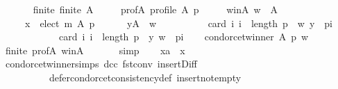 \begin{isabellebody}
\ \ \isamarkupfalse%
\isanewline
\ \ \ \ finite{\isacharcolon}{\kern0pt}\ {\isachardoublequoteopen}finite\ A{\isachardoublequoteclose}\ \isanewline
\ \ \ \ prof{\isacharunderscore}{\kern0pt}A{\isacharcolon}{\kern0pt}\ {\isachardoublequoteopen}profile\ A\ p{\isachardoublequoteclose}\ \isanewline
\ \ \ \ w{\isacharunderscore}{\kern0pt}in{\isacharunderscore}{\kern0pt}A{\isacharcolon}{\kern0pt}\ {\isachardoublequoteopen}w\ {\isasymin}\ A{\isachardoublequoteclose}\ \isanewline
\ \ \ \ {}{\isacharcolon}{\kern0pt}\ {\isachardoublequoteopen}x\ {\isasymin}\ elect\ m\ A\ p{\isachardoublequoteclose}\ \isanewline
\ \ \ \ {}{\isacharcolon}{\kern0pt}\ {\isachardoublequoteopen}{\isasymforall}y{\isasymin}A\ {\isacharminus}{\kern0pt}\ {\isacharbraceleft}{\kern0pt}w{\isacharbraceright}{\kern0pt}{\isachardot}{\kern0pt}\isanewline
\ \ \ \ \ \ \ \ \ \ card\ {\isacharbraceleft}{\kern0pt}i{\isachardot}{\kern0pt}\ i\ {\isacharless}{\kern0pt}\ length\ p\ {\isasymand}\ {\isacharparenleft}{\kern0pt}w{\isacharcomma}{\kern0pt}\ y{\isacharparenright}{\kern0pt}\ {\isasymin}\ {\isacharparenleft}{\kern0pt}p{\isacharbang}{\kern0pt}i{\isacharparenright}{\kern0pt}{\isacharbraceright}{\kern0pt}\ {\isacharless}{\kern0pt}\isanewline
\ \ \ \ \ \ \ \ \ \ \ \ card\ {\isacharbraceleft}{\kern0pt}i{\isachardot}{\kern0pt}\ i\ {\isacharless}{\kern0pt}\ length\ p\ {\isasymand}\ {\isacharparenleft}{\kern0pt}y{\isacharcomma}{\kern0pt}\ w{\isacharparenright}{\kern0pt}\ {\isasymin}\ {\isacharparenleft}{\kern0pt}p{\isacharbang}{\kern0pt}i{\isacharparenright}{\kern0pt}{\isacharbraceright}{\kern0pt}{\isachardoublequoteclose}\isanewline
\ \ \isamarkupfalse%
\ {\isachardoublequoteopen}condorcet{\isacharunderscore}{\kern0pt}winner\ A\ p\ w{\isachardoublequoteclose}\isanewline
\ \ \ \ \isamarkupfalse%
\ finite\ prof{\isacharunderscore}{\kern0pt}A\ w{\isacharunderscore}{\kern0pt}in{\isacharunderscore}{\kern0pt}A\ {\isachardoublequoteopen}{}{\isachardoublequoteclose}\isanewline
\ \ \ \ \isamarkupfalse%
\ simp\isanewline
\ \ \isamarkupfalse%
\ {\isachardoublequoteopen}xa\ {\isacharequal}{\kern0pt}\ x{\isachardoublequoteclose}\isanewline
\ \ \ \ \isamarkupfalse%
\ condorcet{\isacharunderscore}{\kern0pt}winner{\isachardot}{\kern0pt}simps\ dcc\ fst{\isacharunderscore}{\kern0pt}conv\ insert{\isacharunderscore}{\kern0pt}Diff\ {\isachardoublequoteopen}{}{\isachardoublequoteclose}\isanewline
\ \ \ \ \ \ \ \ \ \ defer{\isacharunderscore}{\kern0pt}condorcet{\isacharunderscore}{\kern0pt}consistency{\isacharunderscore}{\kern0pt}def\ insert{\isacharunderscore}{\kern0pt}not{\isacharunderscore}{\kern0pt}empty\isanewline

\end{isabellebody}
